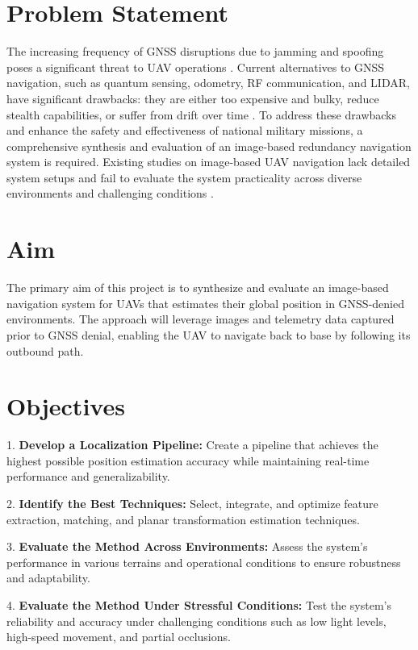 \section{Problem Statement}
The increasing frequency of GNSS disruptions due to jamming and spoofing poses a significant threat to UAV operations \cite{geotab2024gps}. Current alternatives to GNSS navigation, such as quantum sensing, odometry, RF communication, and LIDAR, have significant drawbacks: they are either too expensive and bulky, reduce stealth capabilities, or suffer from drift over time \cite{wright2022cold, Zhuang2023, brewer_line_2024, scoutaerial2024lidar}. To address these drawbacks and enhance the safety and effectiveness of national military missions, a comprehensive synthesis and evaluation of an image-based redundancy navigation system is required. Existing studies on image-based UAV navigation lack detailed system setups and fail to evaluate the system practicality across diverse environments and challenging conditions \cite{sim2002integrated, Zhang2024}.

\section{Aim}
The primary aim of this project is to synthesize and evaluate an image-based navigation system for UAVs that estimates their global position in GNSS-denied environments. The approach will leverage images and telemetry data captured prior to GNSS denial, enabling the UAV to navigate back to base by following its outbound path.

\section{Objectives}


1. \textbf{Develop a Localization Pipeline:} Create a pipeline that achieves the highest possible position estimation accuracy while maintaining real-time performance and generalizability.

2. \textbf{Identify the Best Techniques:} Select, integrate, and optimize feature extraction, matching, and planar transformation estimation techniques.

3. \textbf{Evaluate the Method Across Environments:} Assess the system's performance in various terrains and operational conditions to ensure robustness and adaptability.

4. \textbf{Evaluate the Method Under Stressful Conditions:} Test the system's reliability and accuracy under challenging conditions such as low light levels, high-speed movement, and partial occlusions.





